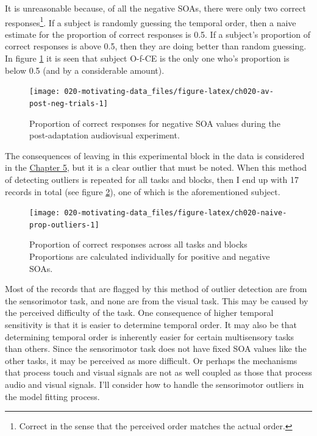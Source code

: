 \documentclass[11pt, oneside, openany]{scrbook}
\begin{document}
It is unreasonable because, of all the negative SOAs, there were only two correct responses\footnote{Correct in the sense that the perceived order matches the actual order.}. If a subject is randomly guessing the temporal order, then a naive estimate for the proportion of correct responses is 0.5. If a subject's proportion of correct responses is above 0.5, then they are doing better than random guessing. In figure \ref{fig:ch020-av-post-neg-trials} it is seen that subject O-f-CE is the only one who's proportion is below 0.5 (and by a considerable amount).

\begin{figure}

{\centering \texttt{[image: 020-motivating-data\_files/figure-latex/ch020-av-post-neg-trials-1]} 

}

\caption{Proportion of correct responses for negative SOA values during the post-adaptation audiovisual experiment.}\label{fig:ch020-av-post-neg-trials}
\end{figure}

The consequences of leaving in this experimental block in the data is considered in the \protect\hyperlink{workflow}{Chapter 5}, but it is a clear outlier that must be noted. When this method of detecting outliers is repeated for all tasks and blocks, then I end up with 17 records in total (see figure \ref{fig:ch020-naive-prop-outliers}), one of which is the aforementioned subject.

\begin{figure}

{\centering \texttt{[image: 020-motivating-data\_files/figure-latex/ch020-naive-prop-outliers-1]} 

}

\caption{Proportion of correct responses across all tasks and blocks Proportions are calculated individually for positive and negative SOAs.}\label{fig:ch020-naive-prop-outliers}
\end{figure}

Most of the records that are flagged by this method of outlier detection are from the sensorimotor task, and none are from the visual task. This may be caused by the perceived difficulty of the task. One consequence of higher temporal sensitivity is that it is easier to determine temporal order. It may also be that determining temporal order is inherently easier for certain multisensory tasks than others. Since the sensorimotor task does not have fixed SOA values like the other tasks, it may be perceived as more difficult. Or perhaps the mechanisms that process touch and visual signals are not as well coupled as those that process audio and visual signals. I'll consider how to handle the sensorimotor outliers in the model fitting process.
\end{document}
